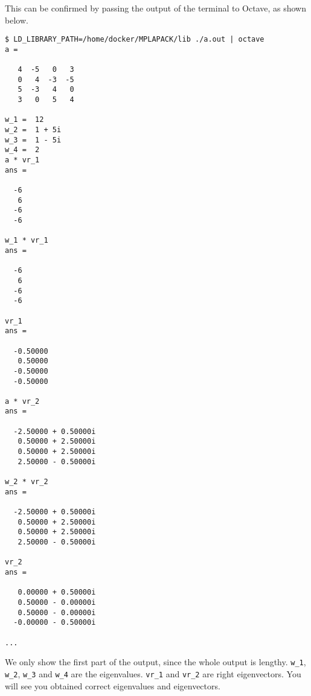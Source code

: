 \documentclass[12pt]{article}
\begin{document}
This can be confirmed by passing the output of the terminal to Octave, as shown below.
{\footnotesize
\begin{verbatim}
$ LD_LIBRARY_PATH=/home/docker/MPLAPACK/lib ./a.out | octave
a =

   4  -5   0   3
   0   4  -3  -5
   5  -3   4   0
   3   0   5   4

w_1 =  12
w_2 =  1 + 5i
w_3 =  1 - 5i
w_4 =  2
a * vr_1
ans =

  -6
   6
  -6
  -6

w_1 * vr_1
ans =

  -6
   6
  -6
  -6

vr_1
ans =

  -0.50000
   0.50000
  -0.50000
  -0.50000

a * vr_2
ans =

  -2.50000 + 0.50000i
   0.50000 + 2.50000i
   0.50000 + 2.50000i
   2.50000 - 0.50000i

w_2 * vr_2
ans =

  -2.50000 + 0.50000i
   0.50000 + 2.50000i
   0.50000 + 2.50000i
   2.50000 - 0.50000i

vr_2
ans =

   0.00000 + 0.50000i
   0.50000 - 0.00000i
   0.50000 - 0.00000i
  -0.00000 - 0.50000i

...
\end{verbatim}
}
We only show the first part of the output, since the whole output is lengthy. 
{\tt w\_1}, {\tt w\_2}, {\tt w\_3} and {\tt w\_4} are the eigenvalues. {\tt vr\_1} and {\tt vr\_2} are right eigenvectors. You will see you obtained correct eigenvalues and eigenvectors.
\end{document}
